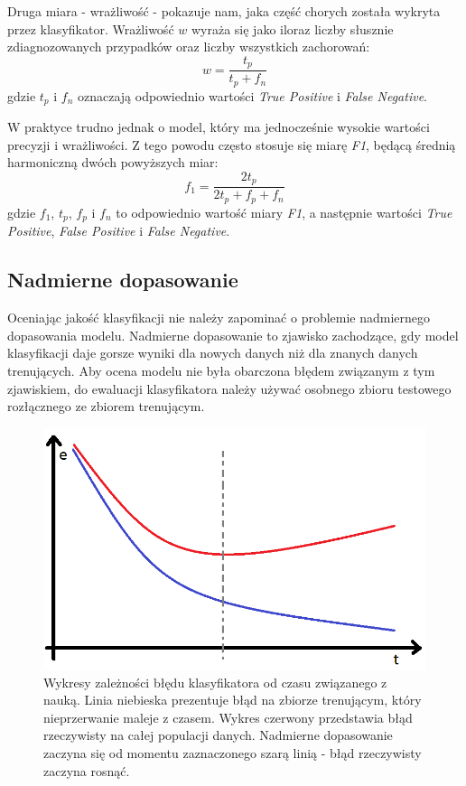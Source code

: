 \documentclass[../thesis.tex]{subfiles}
\begin{document}
Druga miara - wrażliwość - pokazuje nam, jaka część chorych została wykryta przez klasyfikator. Wrażliwość $w$ wyraża się jako iloraz liczby słusznie zdiagnozowanych przypadków oraz liczby wszystkich zachorowań:
\[w = \frac{t_p}{t_p + f_n}\]
gdzie $t_p$ i $f_n$ oznaczają odpowiednio wartości \emph{True Positive} i \emph{False Negative}.

W praktyce trudno jednak o model, który ma jednocześnie wysokie wartości precyzji i wrażliwości. Z tego powodu często stosuje się miarę \emph{F1}, będącą średnią harmoniczną dwóch powyższych miar:
\[f_1 = \frac{2t_p}{2t_p + f_p + f_n}\]
gdzie $f_1$, $t_p$, $f_p$ i $f_n$ to odpowiednio wartość miary \emph{F1}, a następnie wartości \emph{True Positive}, \emph{False Positive} i \emph{False Negative}.

\subsection{Nadmierne dopasowanie}

Oceniając jakość klasyfikacji nie należy zapominać o problemie nadmiernego dopasowania modelu. Nadmierne dopasowanie to zjawisko zachodzące, gdy model klasyfikacji daje gorsze wyniki dla nowych danych niż dla znanych danych trenujących. Aby ocena modelu nie była obarczona błędem związanym z tym zjawiskiem, do ewaluacji klasyfikatora należy używać osobnego zbioru testowego rozłącznego ze zbiorem trenującym.

\begin{figure}[h]
\centering
\includegraphics[height=.2\textheight]{overfitting.png}
\caption{Wykresy zależności błędu klasyfikatora od czasu związanego z nauką. Linia niebieska prezentuje błąd na zbiorze trenującym, który nieprzerwanie maleje z czasem. Wykres czerwony przedstawia błąd rzeczywisty na całej populacji danych. Nadmierne dopasowanie zaczyna się od momentu zaznaczonego szarą linią - błąd rzeczywisty zaczyna rosnąć.}
\label{classification:overfitting}
\end{figure}
\end{document}
